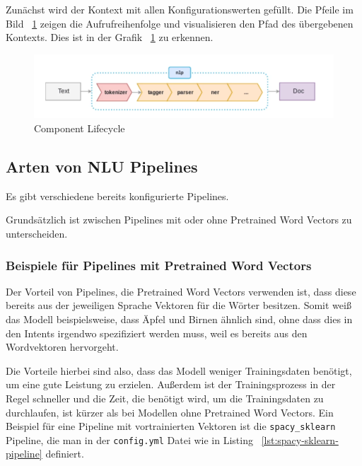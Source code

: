 Zunächst wird der Kontext mit allen Konfigurationswerten gefüllt.
Die Pfeile im Bild ~\ref{fig:pipeline_image} zeigen die Aufrufreihenfolge und visualisieren den Pfad des übergebenen Kontexts.\cite{componentLifecycle, componentLifecycleDoc}
Dies ist in der Grafik ~\ref{fig:pipeline_image} zu erkennen.

\begin{figure}[hbt!]
    \centering
    \includegraphics[scale=0.5]{pics/pipeline}
    \caption{Component Lifecycle~\cite{pipelineImage}}
    \label{fig:pipeline_image}
\end{figure}

\subsection{Arten von NLU Pipelines}\label{subsec:pipeline-types}

Es gibt verschiedene bereits konfigurierte Pipelines.\cite{howToChooseAPipeline}

Grundsätzlich ist zwischen Pipelines mit oder ohne Pretrained Word Vectors zu unterscheiden.

\subsubsection{Beispiele für Pipelines mit Pretrained Word Vectors}

Der Vorteil von Pipelines, die Pretrained Word Vectors verwenden ist, dass diese bereits aus der jeweiligen Sprache Vektoren für die Wörter besitzen.
Somit weiß das Modell beispielsweise, dass Äpfel und Birnen ähnlich sind, ohne dass dies in den Intents irgendwo spezifiziert werden muss, weil es bereits aus den Wordvektoren hervorgeht.\cite{differenceStackOverflow, rasaMasterclassPreConfiguredPipelines}

Die Vorteile hierbei sind also, dass das Modell weniger Trainingsdaten benötigt, um eine gute Leistung zu erzielen.
Außerdem ist der Trainingsprozess in der Regel schneller und die Zeit, die benötigt wird, um die Trainingsdaten zu durchlaufen, ist kürzer als bei Modellen ohne Pretrained Word Vectors.\cite{differenceStackOverflow, pretrainedVsSupervised, rasaMasterclassPreConfiguredPipelines}
Ein Beispiel für eine Pipeline mit vortrainierten Vektoren ist die \texttt{spacy\_sklearn} Pipeline, die man in der \texttt{config.yml} Datei wie in Listing ~\ref{lst:spacy-sklearn-pipeline} definiert.

